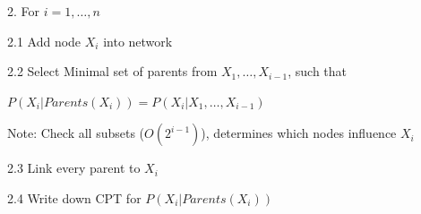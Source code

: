 \documentclass[10pt, a4paper]{article}
\newcommand{\red}[1]{{\color{red}#1}}
\begin{document}
\begin{multicols*}{3}
		2. For $i = 1, \dots , n$

		2.1 Add node $X_i$ into network 

		2.2 Select Minimal set of parents from $X_1, \dots, X_{i - 1}$, such that 

		\centerline{$P(X_i | Parents(X_i)) = P(X_i|X_1, \dots , X_{i - 1})$}

		\red{Note}: Check all subsets ($O(2^{i - 1})$), determines which nodes influence $X_i$

		2.3 Link every parent to $X_i$

		2.4 Write down \red{CPT} for $P(X_i | Parents(X_i))$







		






		
		




	\end{multicols*}
\end{document}
